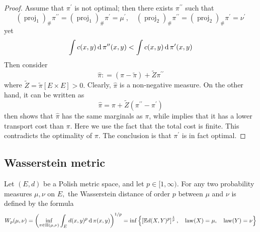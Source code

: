 \begin{proof}
	Assume that \( \pi ^ { \prime } \) is not optimal;
	then there exists
	\( \pi ^ { \prime \prime } \) such that
	\begin{equation}
		\label{proof:restriction_project}
		\left( \operatorname { proj } _ { 1 } \right) _ { \# } \pi ^ { \prime \prime } = \left( \operatorname { proj } _ { 1 } \right) _ { \# } \pi ^ { \prime } = \mu ^ { \prime },
		\quad \left( \operatorname { proj } _ { 2 } \right) _ { \# } \pi ^ { \prime \prime } = \left( \operatorname { proj } _ { 2 } \right) _ { \# } \pi ^ { \prime } = \nu ^ { \prime }
	\end{equation}
	yet
	\begin{equation}
		\label{proof:restriction_not_optimal}
		\int c ( x , y ) \operatorname{d} \pi ^ { \prime \prime } ( x , y ) < \int c ( x , y ) \operatorname{d} \pi ^ { \prime } ( x , y )
	\end{equation}
	Then consider
	\[ \widehat { \pi } : = ( \pi - \widetilde { \pi } ) + \widetilde { Z } \pi ^ { \prime \prime } \]
	where \( \widetilde { Z } = \widetilde { \pi } [ E \times E ] > 0 . \) Clearly, \( \widehat { \pi } \) is a non-negative measure. On the
	other hand, it can be written as
	\[ \widehat { \pi } = \pi + \widetilde { Z } \left( \pi ^ { \prime \prime } - \pi ^ { \prime } \right) \]
	then  shows that \( \widehat { \pi } \) has the same marginals as \( \pi \),
	while  implies that it has a lower transport cost than \( \pi \).
	Here we use the fact that the total cost is finite.
	This contradicts the optimality of \( \pi \). The conclusion
	is that \( \pi ^ { \prime } \) is in fact optimal.
\end{proof}

\subsection{Wasserstein metric}

\begin{defn}
	\label{Wasserstein_distance}
	Let  \(( E , d ) \) be a Polish metric space, and let \( p \in [ 1 , \infty ) . \) For any two probability measures \( \mu , \nu \) on \( E , \) the Wasserstein distance of order \( p \) between \( \mu \) and \( \nu \) is defined by the formula
	\begin{align*}
		W _ { p } ( \mu , \nu )
		= \left( \inf _ { \pi \in \Pi ( \mu , \nu ) } \int _ { E } d ( x , y ) ^ { p } \operatorname{d} \pi ( x , y ) \right) ^ { 1 / p  }
		= \inf \left\{ \left[ \mathbb{ E } d ( X , Y ) ^ { p } \right] ^ { \frac { 1 } { p } } , \quad \operatorname { law } ( X ) = \mu , \quad \operatorname { law } ( Y ) = \nu \right\}
	\end{align*}
\end{defn}

